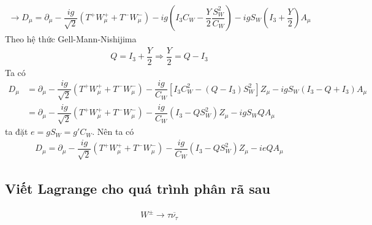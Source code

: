 \documentclass{report}
\newcommand{\f}[2]{\dfrac{#1}{#2}}
\begin{document}
\begin{align*}
	\rightarrow D_{\mu} = \partial_{\mu} - \f{ig}{\sqrt{2}} \left( T^{+} W_{\mu}^{+} + T^{-} W_{\mu}^{-} \right) - ig \left( I_{3} C_{W} - \f{Y}{2} \f{S_{W}^{2}}{C_{W}}\right) - ig S_{W} \left( I_{3} + \f{Y}{2}  \right) A_{\mu}
\end{align*}
Theo hệ thức Gell-Mann-Nishijima
\begin{align*}
	Q = I_{3} + \f{Y}{2}  \Rightarrow \f{Y}{2} = Q - I_{3}
\end{align*}
Ta có 
\begin{align*}
	D_{\mu} 
	&= \partial_{\mu} - \f{ig}{\sqrt{2}} \left( T^{+} W_{\mu}^{+} + T^{-} W_{\mu}^{-} \right) - \f{ig}{C_{W}} \left[ I_{3} C_{W}^{2} - \left( Q - I_{3} \right) S_{W}^{2} \right] Z_{\mu} - ig S_{W} \left( I_{3} - Q + I_{3} \right) A_{\mu}\\
	&= \partial_{\mu} - \f{ig}{\sqrt{2}} \left( T^{+} W_{\mu}^{+} + T^{-} W_{\mu}^{-} \right) - \f{ig}{C_{W}}\left( I_{3} - QS_{W}^{2} \right)Z_{\mu} - igS_{W}Q A_{\mu}
\end{align*}
ta đặt $e = g S_{W} = g' C_{W}$.
Nên ta có
\begin{align*}
	D_{\mu} = \partial_{\mu} - \f{ig}{\sqrt{2}} \left( T^{+} W_{\mu}^{+} + T^{-} W_{\mu}^{-} \right) - \f{ig}{C_{W}} \left( I_{3} - Q S_{W}^{2} \right) Z_{\mu} - ie Q A_{\mu}
\end{align*}


\subsection*{Viết Lagrange cho quá trình phân rã sau}
\begin{align*}
	W^{\pm} \rightarrow \tau \overline{\nu_{\tau}}
\end{align*}
\end{document}
